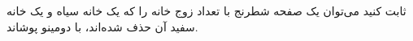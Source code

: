 \begin{PROBLEM}
	\p
	ثابت کنید می‌توان یک صفحه شطرنج با تعداد زوج خانه را که یک خانه سیاه و یک خانه سفید آن حذف شده‌اند، با دومینو پوشاند.
	\SOLUTION{
		\p

	}
\end{PROBLEM}